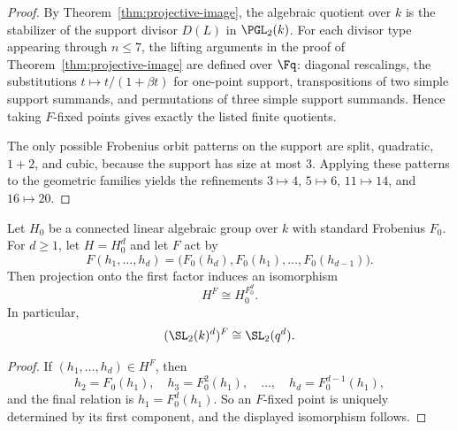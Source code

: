 \begin{proof}
By Theorem~\ref{thm:projective-image}, the algebraic quotient over \(k\) is the
stabilizer of the support divisor \(D(L)\) in \(\PGL_2(k)\). For each divisor
type appearing through \(n\le 7\), the lifting arguments in the proof of
Theorem~\ref{thm:projective-image} are defined over \(\Fq\): diagonal
rescalings, the substitutions \(t\mapsto t/(1+\beta t)\) for one-point support,
transpositions of two simple support summands, and permutations of three
simple support summands. Hence taking \(F\)-fixed points gives exactly the
listed finite quotients.

The only possible Frobenius orbit patterns on the support are split,
quadratic, \(1+2\), and cubic, because the support has size at most \(3\).
Applying these patterns to the geometric families yields the refinements
\(3\mapsto 4\), \(5\mapsto 6\), \(11\mapsto 14\), and \(16\mapsto 20\).
\end{proof}

\begin{lemma}
\label{lem:frobenius-product}
Let \(H_0\) be a connected linear algebraic group over \(k\) with standard
Frobenius \(F_0\). For \(d\geq 1\), let \(H=H_0^d\) and let \(F\) act by
\[
  F(h_1,\dots,h_d)=\bigl(F_0(h_d),F_0(h_1),\dots,F_0(h_{d-1})\bigr).
\]
Then projection onto the first factor induces an isomorphism
\[
  H^F\cong H_0^{F_0^d}.
\]
In particular,
\[
  (\SL_2(k)^d)^F\cong \SL_2(q^d).
\]
\end{lemma}

\begin{proof}
If \((h_1,\dots,h_d)\in H^F\), then
\[
  h_2=F_0(h_1),\quad h_3=F_0^2(h_1),\quad \dots,\quad h_d=F_0^{d-1}(h_1),
\]
and the final relation is \(h_1=F_0^d(h_1)\). So an \(F\)-fixed point is
uniquely determined by its first component, and the displayed isomorphism
follows.
\end{proof}

